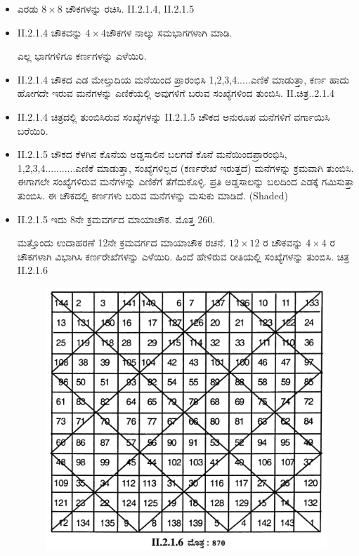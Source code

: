 \begin{itemize}
	\item ಎರಡು $8 \times 8$ ಚೌಕಗಳನ್ನು ರಚಿಸಿ. II.2.1.4, II.2.1.5
	\item II.2.1.4 ಚೌಕವನ್ನು $4 \times 4$ಚೌಕಗಳ ನಾಲ್ಕು ಸಮಭಾಗಗಳಾಗಿ ಮಾಡಿ.

	ಎಲ್ಲ ಭಾಗಗಳಿಗೂ ಕರ್ಣಗಳನ್ನು ಎಳೆಯಿರಿ.
	\item II.2.1.4 ಚೌಕದ ಎಡ ಮೇಲ್ತುದಿಯ ಮನೆಯಿಂದ ಪ್ರಾರಂಭಿಸಿ 1,2,3,4.....ಎಣಿಕೆ ಮಾಡುತ್ತಾ, ಕರ್ಣ ಹಾದು ಹೋಗದೇ ಇರುವ ಮನೆಗಳನ್ನು ಎಣಿಕೆಯಲ್ಲಿ ಅವುಗಳಿಗೆ ಬರುವ ಸಂಖ್ಯೆಗಳಿಂದ ತುಂಬಿಸಿ. II.ಚಿತ್ರ..2.1.4
	\item II.2.1.4 ಚಿತ್ರದಲ್ಲಿ ತುಂಬಿಸಿರುವ ಸಂಖ್ಯೆಗಳನ್ನು II.2.1.5 ಚೌಕದ ಅನುರೂಪ ಮನೆಗಳಿಗೆ ವರ್ಗಾಯಿಸಿ ಬರೆಯಿರಿ.
	\item II.2.1.5 ಚೌಕದ ಕೆಳಗಿನ ಕೊನೆಯ ಅಡ್ಡಸಾಲಿನ ಬಲಗಡೆ ಕೊನೆ ಮನೆಯಿಂದ\break ಪ್ರಾರಂಭಿಸಿ, 1,2,3,4...........ಎಣಿಕೆ ಮಾಡುತ್ತಾ, ಸಂಖ್ಯೆಗಳಿಲ್ಲದ (ಕರ್ಣರೇಖೆ ಇರುತ್ತದೆ) ಮನೆಗಳನ್ನು ಕ್ರಮವಾಗಿ ತುಂಬಿಸಿ. ಈಗಾಗಲೇ ಸಂಖ್ಯೆಗಳಿರುವ ಮನೆ\-ಗಳನ್ನು ಎಣಿಕೆಗೆ ತೆಗೆದುಕೊಳ್ಳಿ. ಪ್ರತಿ ಅಡ್ಡಸಾಲನ್ನು ಬಲದಿಂದ ಎಡಕ್ಕೆ ಗಮಿಸುತ್ತಾ ತುಂಬಿಸಿ. ಈ ಚೌಕದಲ್ಲಿ ಕರ್ಣಗಳು ಬರುವ ಮನೆಗಳನ್ನು ಮಸುಕು ಮಾಡಿದೆ. (Shaded)
	\item II.2.1.5 ಇದು 8ನೇ ಕ್ರಮವರ್ಗದ ಮಾಯಾಚೌಕ. ಮೊತ್ತ 260.

	ಮತ್ತೊಂದು ಉದಾಹರಣೆ 12ನೇ ಕ್ರಮವರ್ಗದ ಮಾಯಾಚೌಕ ರಚನೆ. $12\times 12$ ರ ಚೌಕವನ್ನು $4 \times 4$ ರ ಚೌಕಗಳಾಗಿ ವಿಭಾಗಿಸಿ ಕರ್ಣರೇಖೆಗಳನ್ನು ಎಳೆಯಿರಿ. ಹಿಂದೆ ಹೇಳಿರುವ ರೀತಿಯಲ್ಲಿ ಸಂಖ್ಯೆಗಳನ್ನು ತುಂಬಿಸಿ. ಚಿತ್ರ II.2.1.6
	\begin{figure}[!h]
	\includegraphics{src/figures/chap3/fig3.19.jpg}
	\end{figure}
\end{itemize}

